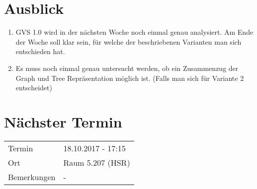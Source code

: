 \documentclass[11pt, a4paper,oneside]{scrartcl}
\begin{document}
\section{Ausblick}
\begin{enumerate}
	\item GVS 1.0 wird in der nächsten Woche noch einmal genau analysiert. Am Ende der Woche soll klar sein, für welche der beschriebenen Varianten man sich entschieden hat.
	\item Es muss noch einmal genau untersucht werden, ob ein Zusammenzug der Graph und Tree Repräsentation möglich ist. (Falls man sich für Variante 2 entscheidet)
\end{enumerate}

\section{Nächster Termin}
\begin{tabu} to \linewidth {l X }
	\toprule
	Termin & 18.10.2017 - 17:15 \\
	Ort & Raum 5.207 (HSR) \\
	Bemerkungen & - \\
	\bottomrule
\end{tabu}
\end{document}
